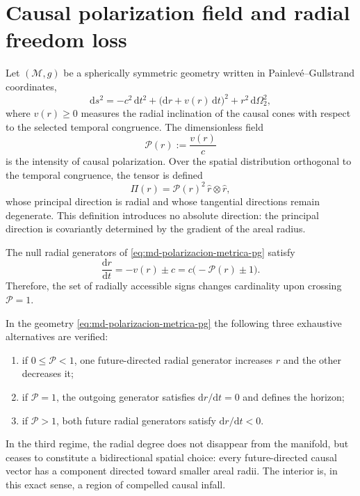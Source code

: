 
\section{Causal polarization field and radial freedom loss}
\label{sec:md-polarizacion-causal-definicion}

Let \((\mathcal M,g)\) be a spherically symmetric geometry written in
Painlevé--Gullstrand coordinates,
\begin{equation}
 \mathrm ds^2
 =-c^2\,\mathrm dt^2
  +\bigl(\mathrm dr+v(r)\,\mathrm dt\bigr)^2
  +r^2\,\mathrm d\Omega_2^2,
 \label{eq:md-polarizacion-metrica-pg}
\end{equation}
where \(v(r)\geq0\) measures the radial inclination of the causal cones with respect
to the selected temporal congruence. The dimensionless field
\begin{equation}
 \mathcal P(r):=\frac{v(r)}{c}
 \label{eq:md-polarizacion-parametro}
\end{equation}
is the intensity of causal polarization. Over the spatial distribution
orthogonal to the temporal congruence, the tensor is defined
\begin{equation}
 \Pi(r)=\mathcal P(r)^2\,\widehat r\otimes\widehat r,
 \label{eq:md-polarizacion-tensor}
\end{equation}
whose principal direction is radial and whose tangential directions
remain degenerate. This definition introduces no absolute direction:
the principal direction is covariantly determined by the gradient of the
areal radius.

The null radial generators of \eqref{eq:md-polarizacion-metrica-pg}
satisfy
\begin{equation}
 \frac{\mathrm dr}{\mathrm dt}=-v(r)\pm c
 =c\bigl(-\mathcal P(r)\pm1\bigr).
 \label{eq:md-polarizacion-generatrices}
\end{equation}
Therefore, the set of radially accessible signs changes cardinality
upon crossing \(\mathcal P=1\).

\begin{theorem}
\label{thm:md-polarizacion-caida-obligada}
In the geometry \eqref{eq:md-polarizacion-metrica-pg} the following three exhaustive alternatives are verified:
\begin{enumerate}
 \item if \(0\leq\mathcal P<1\), one future-directed radial generator increases \(r\)
 and the other decreases it;
 \item if \(\mathcal P=1\), the outgoing generator satisfies
 \(\mathrm dr/\mathrm dt=0\) and defines the horizon;
 \item if \(\mathcal P>1\), both future radial generators satisfy
 \(\mathrm dr/\mathrm dt<0\).
\end{enumerate}
In the third regime, the radial degree does not disappear from the manifold, but ceases
to constitute a bidirectional spatial choice: every future-directed causal vector
has a component directed toward smaller areal radii. The interior is, in
this exact sense, a region of compelled causal infall.
\end{theorem}

